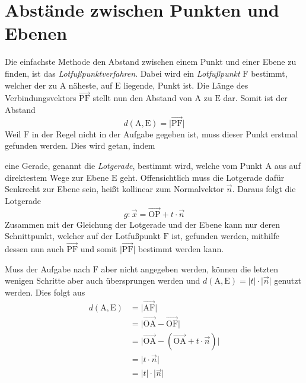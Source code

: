\documentclass{article}
\begin{document}
   
\newcommand{\norm}[1]{\big| {#1} \big|}  
\newcommand{\vect}[1]{\overrightarrow{#1}} 
\newcommand{\vectp}[1]{\vect{\mathrm{#1}}}
  
\section{Abstände zwischen Punkten und Ebenen}
 
\begin{minipage}[t]{\dimexpr\textwidth-5cm}
 Die einfachste Methode den Abstand zwischen einem Punkt und einer Ebene zu finden, ist das \emph{Lotfußpunktverfahren}. Dabei wird ein \emph{Lotfußpunkt} $\mathrm{F}$ bestimmt, welcher der zu $\mathrm{A}$ näheste, auf $\mathrm{E}$ liegende, Punkt ist. Die Länge des Verbindungsvektors $\vectp{PF}$ stellt nun den Abstand von $\mathrm{A}$ zu $\mathrm{E}$ dar. Somit ist der Abstand
 \[
  d(\mathrm{A}, \mathrm{E}) = \norm{\vectp{PF}}
 \] 
 Weil $\mathrm{F}$ in der Regel nicht in der Aufgabe gegeben ist, muss dieser Punkt erstmal gefunden werden. Dies wird getan, indem \\[-0.7em]
\end{minipage} 
\hfill
\begin{minipage}[t]{5cm}
 \centering 
\end{minipage}
eine Gerade, genannt die \emph{Lotgerade}, bestimmt wird, welche vom Punkt $\mathrm{A}$ aus auf direktestem Wege zur Ebene $\mathrm{E}$ geht. Offensichtlich muss die Lotgerade dafür Senkrecht zur Ebene sein, heißt kollinear zum Normalvektor $\vect{n}$. Daraus folgt die Lotgerade
\[
 g: \vect{x} = \vectp{OP} + t \cdot \vect{n} 
\]
Zusammen mit der Gleichung der Lotgerade und der Ebene kann nur deren Schnittpunkt, welcher auf der Lotfußpunkt $\mathrm{F}$ ist, gefunden werden, mithilfe dessen nun auch $\vectp{PF}$ und somit $\norm{\vectp{PF}}$ bestimmt werden kann.
 
Muss der Aufgabe nach $\mathrm{F}$ aber nicht angegeben werden, können die letzten wenigen Schritte aber auch übersprungen werden und 
\(
 d(\mathrm{A}, \mathrm{E}) = \norm{t} \cdot \norm{\vect{n}}
\)
genutzt werden. Dies folgt aus 
\begin{align*}
 d(\mathrm{A}, \mathrm{E}) &= \norm{\vectp{AF}} \\
  &= \norm{\vectp{OA} - \vectp{OF}} \\ 
  &= \norm{\vectp{OA} - (\vectp{OA} + t \cdot \vect{n})} \\
  &= \norm{t \cdot \vect{n}} \\
  &= \norm{t} \cdot \norm{\vect{n}}
\end{align*}
 
\end{document}
